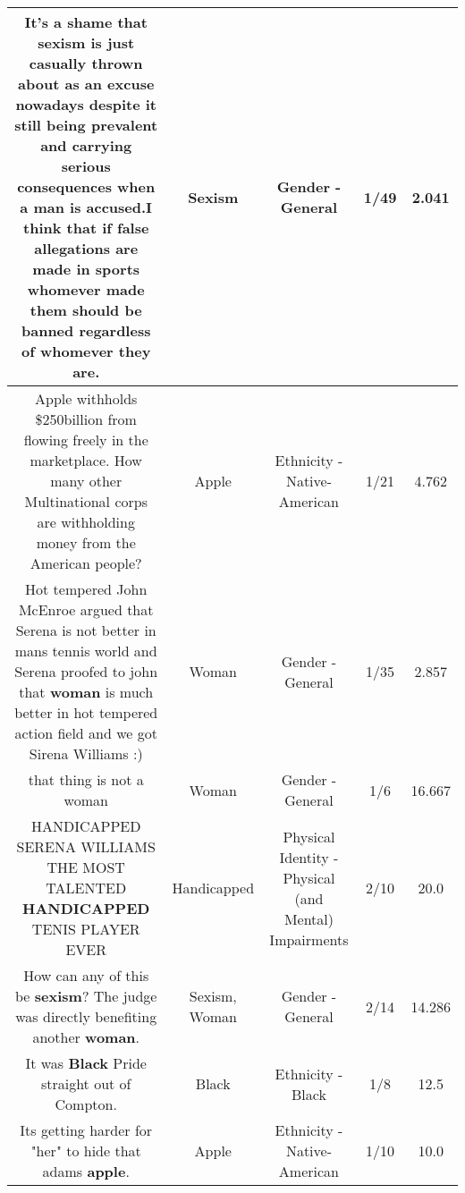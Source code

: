 \documentclass[11pt]{article}
\newlength\mylength
\begin{document}
\begin{center}
\begin{longtable}{|C{.65\mylength}|C{.30\mylength}|C{.12\mylength}|C{.12\mylength}|C{.12\mylength}|}
  \small It's a shame that \textbf{sexism} is just casually thrown about as an excuse nowadays despite it still being prevalent and carrying serious consequences when a man is accused.I think  that if false allegations are made in sports whomever made them should be banned regardless of whomever they are.\normalsize   & Sexism & Gender - General & 1/49 & 2.041 \\  \hline
  \small Apple withholds \$250billion from flowing freely in the marketplace. How many other Multinational corps are withholding money from the American people?\normalsize   & Apple & Ethnicity - Native-American & 1/21 & 4.762 \\  \hline
  \small Hot tempered John McEnroe argued that Serena is not better in mans tennis world and Serena proofed to john that \textbf{woman} is much better in hot tempered action field and we got Sirena Williams :)\normalsize   & Woman & Gender - General & 1/35 & 2.857 \\  \hline
  \small that thing is not a woman\normalsize   & Woman & Gender - General & 1/6 & 16.667 \\  \hline
  \small HANDICAPPED SERENA WILLIAMS THE MOST TALENTED \textbf{HANDICAPPED} TENIS PLAYER EVER\normalsize   & Handicapped & Physical Identity - Physical (and Mental) Impairments & 2/10 & 20.0 \\  \hline
  \small How can any of this be \textbf{sexism}? The judge was directly benefiting another \textbf{woman}.\normalsize   & Sexism, Woman & Gender - General & 2/14 & 14.286 \\  \hline
  \small It was \textbf{Black} Pride straight out of Compton.\normalsize   & Black & Ethnicity - Black & 1/8 & 12.5 \\  \hline
  \small Its getting harder for "her" to hide that adams \textbf{apple}.\normalsize   & Apple & Ethnicity - Native-American & 1/10 & 10.0 \\  \hline

\end{longtable}
\end{center}
\end{document}
